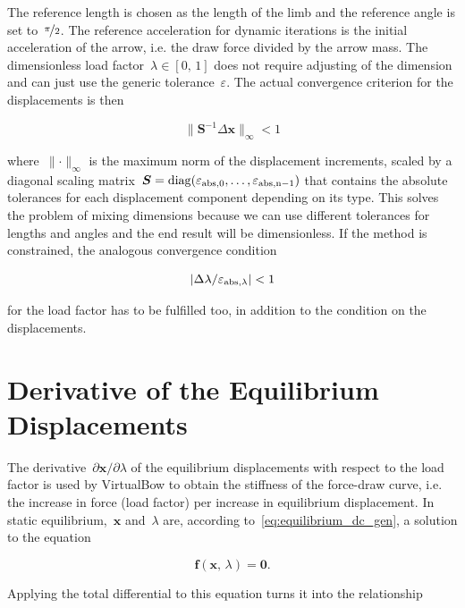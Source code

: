 The reference length is chosen as the length of the limb and the reference angle is set to~$\nicefrac{\pi}{2}$.
The reference acceleration for dynamic iterations is the initial acceleration of the arrow, i.e. the draw force divided by the arrow mass.
The dimensionless load factor~$\lambda \in [0,\,1]$ does not require adjusting of the dimension and can just use the generic tolerance~$\varepsilon$.
The actual convergence criterion for the displacements is then

\begin{equation}
\lVert \boldsymbol{S}^{-1}\Delta\boldsymbol{x} \rVert_{\infty} < 1 
\end{equation}

where~$\lVert\cdot\rVert_{\infty}$ is the maximum norm of the displacement increments, scaled by a diagonal scaling matrix~$\boldsymbol{S} = \rm{diag}(\varepsilon_{\rm{abs},0},\ldots,\varepsilon_{\rm{abs},n-1})$ that contains the absolute tolerances for each displacement component depending on its type.
This solves the problem of mixing dimensions because we can use different tolerances for lengths and angles and the end result will be dimensionless.
If the method is constrained, the analogous convergence condition

\begin{equation}
|\Delta\lambda / \varepsilon_{\rm{abs},\lambda}| < 1
\end{equation}

for the load factor has to be fulfilled too, in addition to the condition on the displacements.

\section{Derivative of the Equilibrium Displacements}

The derivative~$\partial \boldsymbol{x}/\partial \lambda$ of the equilibrium displacements with respect to the load factor is used by VirtualBow to obtain the stiffness of the force-draw curve, i.e. the increase in force (load factor) per increase in equilibrium displacement.
In static equilibrium,~$\boldsymbol{x}$ and~$\lambda$ are, according to~\eqref{eq:equilibrium_dc_gen}, a solution to the equation

\begin{equation}
\boldsymbol{f}(\boldsymbol{x},\,\lambda) = \boldsymbol{0}.
\end{equation}

Applying the total differential to this equation turns it into the relationship

